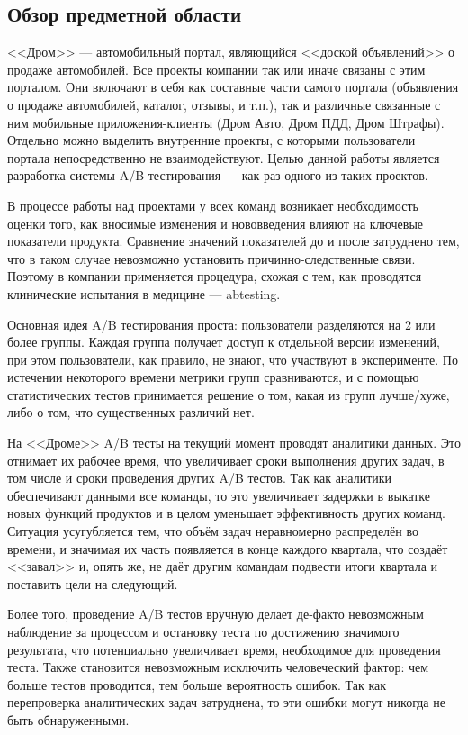 \documentclass[../document.tex]{subfiles}
\begin{document}
	\subsection{Обзор предметной области}
	\par <<Дром>> --- автомобильный портал, являющийся <<доской объявлений>> о продаже автомобилей. Все проекты компании так или иначе связаны с этим порталом. Они включают в себя как составные части самого портала (объявления о продаже автомобилей, каталог, отзывы, и т.п.), так и различные связанные с ним мобильные приложения-клиенты (Дром Авто, Дром ПДД, Дром Штрафы). Отдельно можно выделить внутренние проекты, с которыми пользователи портала непосредственно не взаимодействуют. Целью данной работы является разработка системы A/B тестирования --- как раз одного из таких проектов.
	\par В процессе работы над проектами у всех команд возникает необходимость оценки того, как вносимые изменения и нововведения влияют на ключевые показатели продукта. Сравнение значений показателей до и после затруднено тем, что в таком случае невозможно установить причинно-следственные связи. Поэтому в компании применяется процедура, схожая с тем, как проводятся клинические испытания в медицине --- \gls{abtesting}.
	\par Основная идея A/B тестирования проста: пользователи разделяются на 2 или более группы. Каждая группа получает доступ к отдельной версии изменений, при этом пользователи, как правило, не знают, что участвуют в эксперименте. По истечении некоторого времени метрики групп сравниваются, и с помощью статистических тестов принимается решение о том, какая из групп лучше/хуже, либо о том, что существенных различий нет.
	\par На <<Дроме>> A/B тесты на текущий момент проводят аналитики данных. Это отнимает их рабочее время, что увеличивает сроки выполнения других задач, в том числе и сроки проведения других A/B тестов. Так как аналитики обеспечивают данными все команды, то это увеличивает задержки в выкатке новых функций продуктов и в целом уменьшает эффективность других команд. Ситуация усугубляется тем, что объём задач неравномерно распределён во времени, и значимая их часть появляется в конце каждого квартала, что создаёт <<завал>> и, опять же, не даёт другим командам подвести итоги квартала и поставить цели на следующий.
	\par Более того, проведение A/B тестов вручную делает де-факто невозможным наблюдение за процессом и остановку теста по достижению значимого результата, что потенциально увеличивает время, необходимое для проведения теста. Также становится невозможным исключить человеческий фактор: чем больше тестов проводится, тем больше вероятность ошибок. Так как перепроверка аналитических задач затруднена, то эти ошибки могут никогда не быть обнаруженными.
\end{document}

